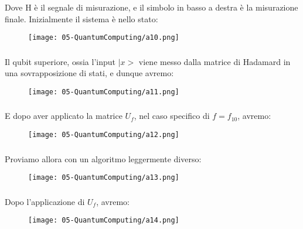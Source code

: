 \subsubsection{}
Dove H è il segnale di misurazione, e il simbolo in basso a destra è la misurazione finale.
Inizialmente il sistema è nello stato:
\begin{figure}[h]
    \centering
    \texttt{[image: 05-QuantumComputing/a10.png]}
\end{figure}
\subsubsection{}
Il qubit superiore, ossia l’input $|x>$ viene messo dalla matrice di
Hadamard in una sovrapposizione di stati, e dunque avremo:
\begin{figure}[!h]
    \centering
    \texttt{[image: 05-QuantumComputing/a11.png]}
\end{figure}
\subsubsection{}
E dopo aver applicato la matrice $U_f$, nel caso specifico di $f = f_{10}$,
avremo:

\begin{figure}[!h]
    \centering
    \texttt{[image: 05-QuantumComputing/a12.png]}
\end{figure}

\subsubsection{}
Proviamo allora con un algoritmo leggermente diverso:

\begin{figure}[!h]
    \centering
    \texttt{[image: 05-QuantumComputing/a13.png]}
\end{figure}
\subsubsection{}
Dopo l’applicazione di $U_f$, avremo:
\begin{figure}[!h]
    \centering
    \texttt{[image: 05-QuantumComputing/a14.png]}
\end{figure}


